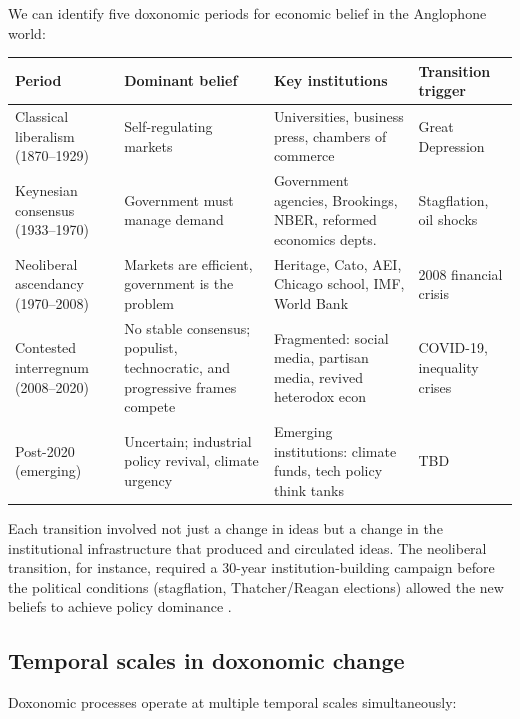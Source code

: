 \begin{example}
\label{ex:econ-periodization}
We can identify five doxonomic periods for economic belief in the Anglophone world:

\begin{center}
\begin{tabular}{p{2.5cm}p{3.5cm}p{3cm}p{3.5cm}}
\toprule
Period & Dominant belief & Key institutions & Transition trigger \\
\midrule
Classical liberalism (1870--1929) & Self-regulating markets & Universities, business press, chambers of commerce & Great Depression \\[4pt]
Keynesian consensus (1933--1970) & Government must manage demand & Government agencies, Brookings, NBER, reformed economics depts.\ & Stagflation, oil shocks \\[4pt]
Neoliberal ascendancy (1970--2008) & Markets are efficient, government is the problem & Heritage, Cato, AEI, Chicago school, IMF, World Bank & 2008 financial crisis \\[4pt]
Contested interregnum (2008--2020) & No stable consensus; populist, technocratic, and progressive frames compete & Fragmented: social media, partisan media, revived heterodox econ & COVID-19, inequality crises \\[4pt]
Post-2020 (emerging) & Uncertain; industrial policy revival, climate urgency & Emerging institutions: climate funds, tech policy think tanks & TBD \\
\bottomrule
\end{tabular}
\end{center}

Each transition involved not just a change in ideas but a change in the institutional infrastructure that produced and circulated ideas.
The neoliberal transition, for instance, required a 30-year institution-building campaign before the political conditions (stagflation, Thatcher/Reagan elections) allowed the new beliefs to achieve policy dominance \autocite{mirowski2009, harvey2005, phillipsfein2009}.
\end{example}

\subsection{Temporal scales in doxonomic change}

Doxonomic processes operate at multiple temporal scales simultaneously:

